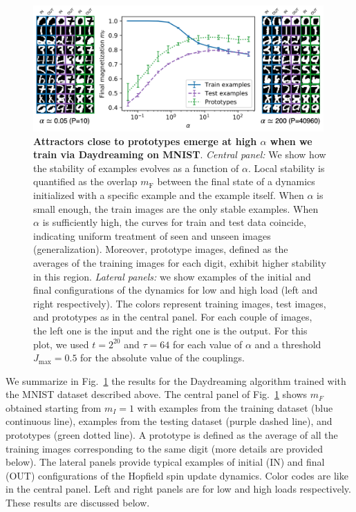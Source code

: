 \documentclass[a4paper]{cas-sc}
\newcommand{\mF}{m_\text{F}}
\begin{document}
\begin{figure}
\centering
    \includegraphics[width=0.99\textwidth]{fig7.png}
    \caption{\textbf{Attractors close to prototypes emerge at high $\alpha$ when we train via Daydreaming on MNIST}. \emph{Central panel:} We show how the stability of examples evolves as a function of $\alpha$. Local stability is  quantified as the overlap $\mF$ between the final state of a dynamics initialized with a specific example and the example itself. When $\alpha$ is small enough, the train images are the only stable examples. When $\alpha$ is sufficiently high, the curves for train and test data coincide, indicating uniform treatment of seen and unseen images (generalization). Moreover, prototype images, defined as the averages of the training images for each digit, exhibit higher stability in this region. \emph{Lateral panels:} we show examples of the initial and final configurations of the dynamics for low and high load (left and right respectively). The colors represent training images, test images, and prototypes as in the central panel. For each couple of images, the left one is the input and the right one is the output.
    For this plot, we used $t=2^{20}$ and $\tau = 64$ for each value of $\alpha$ and a threshold $ J_\mathrm{max}= 0.5$ for the absolute value of the couplings.}
    \label{fig:results_mnist}
\end{figure}

We summarize in Fig.~\ref{fig:results_mnist} the results for the Daydreaming algorithm trained with the MNIST dataset described above.
The central panel of Fig.~\ref{fig:results_mnist} shows $m_F$ obtained starting from $m_I=1$ with examples from the training dataset (blue continuous line), examples from the testing dataset (purple dashed line), and prototypes (green dotted line). A prototype is defined as the average of all the training images corresponding to the same digit (more details are provided below).
The lateral panels provide typical examples of initial (IN) and final (OUT) configurations of the Hopfield spin update dynamics. Color codes are like in the central panel. Left and right panels are for low and high loads respectively. These results are discussed below.
\end{document}
